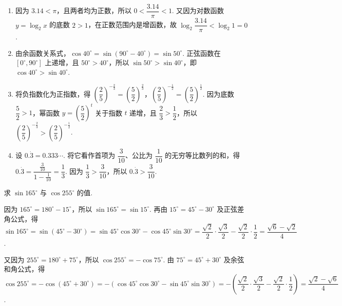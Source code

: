\begin{solution}
\begin{enumerate}
    \item 因为 \(3.14<\pi\)，且两者均为正数，所以 \(0<\dfrac{3.14}{\pi}<1\). 又因为对数函数 \(y=\log_2 x\) 的底数 \(2>1\)，在正数范围内是增函数，故 \(\log_2\dfrac{3.14}{\pi}<\log_2 1=0\).
    \item 由余函数关系式，\(\cos40^\circ=\sin(90^\circ-40^\circ)=\sin50^\circ\). 正弦函数在 \([0^\circ,90^\circ]\) 上递增，且 \(50^\circ>40^\circ\)，所以 \(\sin50^\circ>\sin40^\circ\)，即 \(\cos40^\circ>\sin40^\circ\).
    \item 将负指数化为正指数，得 \(\left(\dfrac{2}{5}\right)^{-\frac{2}{3}}=\left(\dfrac{5}{2}\right)^{\frac{2}{3}}\)，\(\left(\dfrac{2}{5}\right)^{-\frac{1}{2}}=\left(\dfrac{5}{2}\right)^{\frac{1}{2}}\). 因为底数 \(\dfrac{5}{2}>1\)，幂函数 \(y=\left(\dfrac{5}{2}\right)^t\) 关于指数 \(t\) 递增，且 \(\dfrac{2}{3}>\dfrac{1}{2}\)，所以 \(\left(\dfrac{2}{5}\right)^{-\frac{2}{3}}>\left(\dfrac{2}{5}\right)^{-\frac{1}{2}}\).
    \item 设 \(0.\dot{3}=0.333\cdots\). 将它看作首项为 \(\dfrac{3}{10}\)、公比为 \(\dfrac{1}{10}\) 的无穷等比数列的和，得 \(0.\dot{3}=\dfrac{\frac{3}{10}}{1-\frac{1}{10}}=\dfrac{1}{3}\). 因为 \(\dfrac{1}{3}>\dfrac{3}{10}\)，所以 \(0.\dot{3}>\dfrac{3}{10}\).
\end{enumerate}
\end{solution}

\begin{problem}
求 \(\sin165^\circ\) 与 \(\cos255^\circ\) 的值.
\end{problem}

\begin{solution}
因为 \(165^\circ=180^\circ-15^\circ\)，所以 \(\sin165^\circ=\sin15^\circ\). 再由 \(15^\circ=45^\circ-30^\circ\) 及正弦差角公式，得 \(\sin165^\circ=\sin(45^\circ-30^\circ)=\sin45^\circ\cos30^\circ-\cos45^\circ\sin30^\circ=\dfrac{\sqrt{2}}{2}\cdot\dfrac{\sqrt{3}}{2}-\dfrac{\sqrt{2}}{2}\cdot\dfrac{1}{2}=\dfrac{\sqrt{6}-\sqrt{2}}{4}\).

又因为 \(255^\circ=180^\circ+75^\circ\)，所以 \(\cos255^\circ=-\cos75^\circ\). 由 \(75^\circ=45^\circ+30^\circ\) 及余弦和角公式，得 \(\cos255^\circ=-\cos(45^\circ+30^\circ)=-\left(\cos45^\circ\cos30^\circ-\sin45^\circ\sin30^\circ\right)=-\left(\dfrac{\sqrt{2}}{2}\cdot\dfrac{\sqrt{3}}{2}-\dfrac{\sqrt{2}}{2}\cdot\dfrac{1}{2}\right)=\dfrac{\sqrt{2}-\sqrt{6}}{4}\).
\end{solution}

